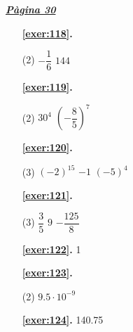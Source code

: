 \hyperlink{page.30}{\textbf{\em Pàgina 30}}
\begin{enumerate}



 \item[\fontfamily{phv}\selectfont\color{blue}\textbf{\ref{exer:118}. }] \label{ans:118}
 \begin{tasks}[column-sep=1em, item-indent=1.3333em](2)
	 \task $-\dfrac {1}{6}$
	 \task $144$
\end{tasks}
 \end{enumerate}
\begin{enumerate}



 \item[\fontfamily{phv}\selectfont\color{blue}\textbf{\ref{exer:119}. }] \label{ans:119}
 \begin{tasks}[column-sep=1em, item-indent=1.3333em](2)
	 \task $30^4$
	 \task* $\left (-\dfrac {8}{5}\right )^7$
\end{tasks}



 \item[\fontfamily{phv}\selectfont\color{blue}\textbf{\ref{exer:120}. }] \label{ans:120}
 \begin{tasks}[column-sep=1em, item-indent=1.3333em](3)
	 \task $(-2)^{15}$
	 \task $-1$
	 \task $(-5)^{4}$
\end{tasks}



 \item[\fontfamily{phv}\selectfont\color{blue}\textbf{\ref{exer:121}. }] \label{ans:121}
 \begin{tasks}[column-sep=1em, item-indent=1.3333em](3)
	 \task $\dfrac {3}{5}$
	 \task $9$
	 \task $-\dfrac {125}{8}$
\end{tasks}
\item[\fontfamily{phv}\selectfont\color{blue}\textbf{\ref{exer:122}. }] \label{ans:122} 
1



 \item[\fontfamily{phv}\selectfont\color{blue}\textbf{\ref{exer:123}. }] \label{ans:123}
 \begin{tasks}[column-sep=1em, item-indent=1.3333em](2)
	 \task $9.5 \cdot 10^{-9}$
\end{tasks}
\item[\fontfamily{phv}\selectfont\color{blue}\textbf{\ref{exer:124}. }] \label{ans:124} 
140.75



\end{enumerate}
